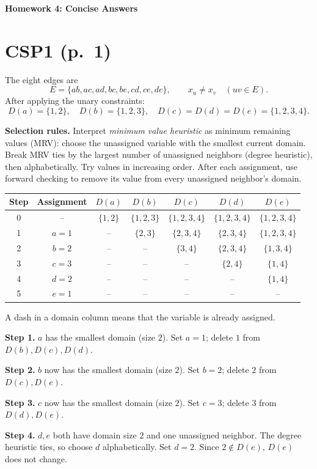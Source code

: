\documentclass[11pt,a4paper]{article}
\begin{document}
\begin{center}{\Large\bfseries Homework 4: Concise Answers}\end{center}
\section*{CSP1 (p.\ 1)}
The eight edges are
\[
E=\{ab,ac,ad,bc,be,cd,ce,de\},\qquad x_u\ne x_v\quad(uv\in E).
\]
After applying the unary constraints:
\[
D(a)=\{1,2\},\quad D(b)=\{1,2,3\},\quad
D(c)=D(d)=D(e)=\{1,2,3,4\}.
\]

\textbf{Selection rules.} Interpret \emph{minimum value heuristic} as
minimum remaining values (MRV): choose the unassigned variable with the
smallest current domain. Break MRV ties by the largest number of
unassigned neighbors (degree heuristic), then alphabetically.
Try values in increasing order. After each assignment, use forward
checking to remove its value from every unassigned neighbor's domain.

\begin{center}
\small
\renewcommand{\arraystretch}{1.35}
\begin{tabular}{c|c|ccccc}
\toprule
Step&Assignment&$D(a)$&$D(b)$&$D(c)$&$D(d)$&$D(e)$\\
\midrule
0&--&$\{1,2\}$&$\{1,2,3\}$&$\{1,2,3,4\}$&$\{1,2,3,4\}$&$\{1,2,3,4\}$\\
1&$a=1$&--&$\{2,3\}$&$\{2,3,4\}$&$\{2,3,4\}$&$\{1,2,3,4\}$\\
2&$b=2$&--&--&$\{3,4\}$&$\{2,3,4\}$&$\{1,3,4\}$\\
3&$c=3$&--&--&--&$\{2,4\}$&$\{1,4\}$\\
4&$d=2$&--&--&--&--&$\{1,4\}$\\
5&$e=1$&--&--&--&--&--\\
\bottomrule
\end{tabular}
\end{center}
A dash in a domain column means that the variable is already assigned.

\textbf{Step 1.} $a$ has the smallest domain (size $2$). Set $a=1$;
delete $1$ from $D(b),D(c),D(d)$.

\textbf{Step 2.} $b$ now has the smallest domain (size $2$). Set $b=2$;
delete $2$ from $D(c),D(e)$.

\textbf{Step 3.} $c$ now has the smallest domain (size $2$). Set $c=3$;
delete $3$ from $D(d),D(e)$.

\textbf{Step 4.} $d,e$ both have domain size $2$ and one unassigned
neighbor. The degree heuristic ties, so choose $d$ alphabetically.
Set $d=2$. Since $2\notin D(e)$, $D(e)$ does not change.
\end{document}
